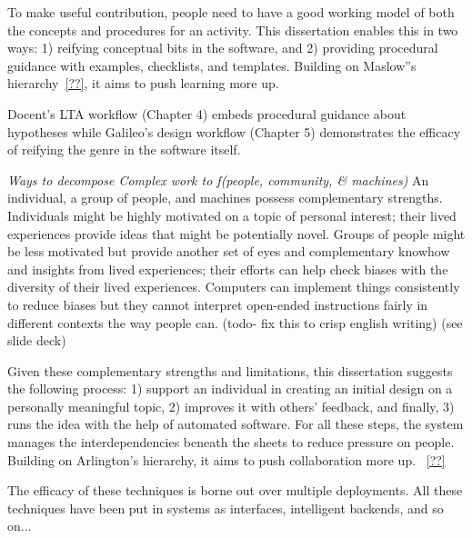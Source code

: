 To make useful contribution, people need to have a good working model of both the concepts and procedures for an activity. This dissertation enables this in two ways: 1) reifying conceptual bits in the software, and 2) providing procedural guidance with examples, checklists, and templates. Building on Maslow''s hierarchy~\ref{??}, it aims to push learning more up.

Docent's LTA workflow (Chapter 4) embeds procedural guidance about hypotheses while Galileo's design workflow (Chapter 5) demonstrates the efficacy of reifying the genre in the software itself.

\textit{Ways to decompose Complex work to f(people, community, \& machines)}
An individual, a group of people, and machines possess complementary strengths. Individuals might be highly motivated on a topic of personal interest; their lived experiences provide ideas that might be potentially novel. Groups of people might be less motivated but provide another set of eyes and complementary knowhow and insights from lived experiences; their efforts can help check biases with the diversity of their lived experiences. Computers can implement things consistently to reduce biases but they cannot interpret open-ended instructions fairly in different contexts the way people can.  (todo- fix this to crisp english writing) (see slide deck)

Given these complementary strengths and limitations, this dissertation suggests the following process: 1) support an individual in creating an initial design on a personally meaningful topic, 2) improves it with others' feedback, and finally, 3) runs the idea with the help of automated software. For all these steps, the system manages the interdependencies beneath the sheets to reduce pressure on people. Building on Arlington's hierarchy, it aims to push collaboration more up.
~\ref{??}

The efficacy of these techniques is borne out over multiple deployments. All these techniques have been put in systems as interfaces, intelligent backends, and so on... \\



